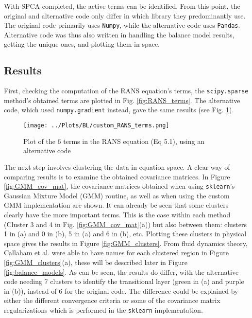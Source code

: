 \documentclass[12pt]{report} %
\begin{document}
With SPCA completed, the active terms can be identified. From this point, the original and alternative code only differ in which library they predominantly use. The original code primarily uses \texttt{Numpy}, while the alternative code uses \texttt{Pandas}. Alternative code was thus also written in handling the balance model results, getting the unique ones, and plotting them in space.


\subsection{Results}

First, checking the computation of the RANS equation's terms, the \texttt{scipy.sparse} method's obtained terms are plotted in Fig. \ref{fig:RANS_terms}. The alternative code, which used \texttt{numpy.gradient} instead, gave the same results (see Fig. \ref{fig:custom_RANS_terms}).

\begin{figure}[htbp]
  \centering
  \texttt{[image: ../Plots/BL/custom\_RANS\_terms.png]}
  \caption{Plot of the 6 terms in the RANS equation (Eq 5.1), using an alternative code}
  \label{fig:custom_RANS_terms}
\end{figure}

The next step involves clustering the data in equation space. A clear way of comparing results is to examine the obtained covariance matrices. In Figure \ref{fig:GMM_cov_mat}, the covariance matrices obtained when using \texttt{sklearn}’s Gaussian Mixture Model (GMM) routine, as well as when using the custom GMM implementation are shown. It can already be seen that some clusters clearly have the more important terms. This is the case within each method (Cluster 3 and 4 in Fig. \ref{fig:GMM_cov_mat}(a)) but also between them: clusters 1 in (a) and 0 in (b), 5 in (a) and 6 in (b), etc. Plotting these clusters in physical space gives the results in Figure \ref{fig:GMM_clusters}. From fluid dynamics theory, Callaham et al. were able to have names for each clustered region in Figure \ref{fig:GMM_clusters}(a), these will be described later in Figure \ref{fig:balance_models}. As can be seen, the results do differ, with the alternative code needing 7 clusters to identify the transitional layer (green in (a) and purple in (b)), instead of 6 for the original code. The difference could be explained by either the different convergence criteria or some of the covariance matrix regularizations which is performed in the \texttt{sklearn} implementation\cite{sklearnGMM}.
\end{document}
